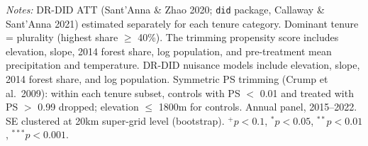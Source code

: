 \begin{table}[t!]
\begin{tabular}{lcccccc}
\bottomrule
\end{tabular}
\begin{tablenotes}[flushleft]
\small
\item \textit{Notes:} DR-DID ATT (Sant'Anna \& Zhao 2020; \texttt{did} package, Callaway \& Sant'Anna 2021) estimated separately for each tenure category. Dominant tenure = plurality (highest share $\geq$ 40\%). The trimming propensity score includes elevation, slope, 2014 forest share, log population, and pre-treatment mean precipitation and temperature. DR-DID nuisance models include elevation, slope, 2014 forest share, and log population. Symmetric PS trimming (Crump et al.\ 2009): within each tenure subset, controls with PS $<$ 0.01 and treated with PS $>$ 0.99 dropped; elevation $\leq$ 1800m for controls. Annual panel, 2015--2022. SE clustered at 20km super-grid level (bootstrap). $^{+}p<0.1$, $^{*}p<0.05$, $^{**}p<0.01$, $^{***}p<0.001$.
\end{tablenotes}
\end{table}
